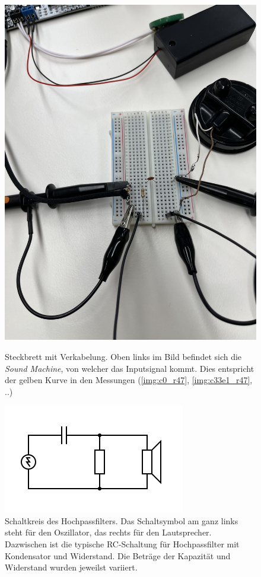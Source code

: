\documentclass{article}
\begin{document}
\begin{figure}[htp]
        \centering
        \includegraphics[width=\linewidth]{figures/setup_close.png}
        \caption{Steckbrett mit Verkabelung. Oben links im Bild befindet sich die \emph{Sound Machine}, von welcher das Inputsignal kommt. Dies entspricht der gelben Kurve in den Messungen (\ref{img:c0_r47}, \ref{img:c33e1_r47}, ..)}
        \label{img:setup_close}
    \endminipage\hfill
        \centering
        \includegraphics[width=\linewidth]{figures/circuit.png}
        \caption{Schaltkreis des Hochpassfilters. Das Schaltsymbol am ganz links steht für den Oszillator, das rechts für den Lautsprecher. Dazwischen ist die typische RC-Schaltung für Hochpassfilter mit Kondensator und Widerstand. Die Beträge der Kapazität und Widerstand wurden jeweilst variiert.}
        \label{fig:circuit}
    \endminipage\hfill
\end{figure}
\end{document}
